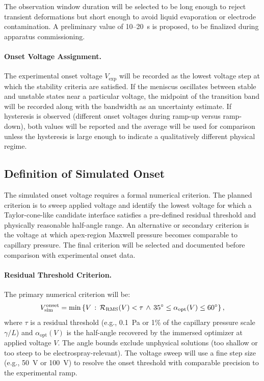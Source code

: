 The observation window duration will be selected to be long enough to reject transient deformations but short enough to avoid liquid evaporation or electrode contamination. A preliminary value of 10--20~s is proposed, to be finalized during apparatus commissioning.

\paragraph{Onset Voltage Assignment.} The experimental onset voltage $V_{\mathrm{exp}}$ will be recorded as the lowest voltage step at which the stability criteria are satisfied. If the meniscus oscillates between stable and unstable states near a particular voltage, the midpoint of the transition band will be recorded along with the bandwidth as an uncertainty estimate. If hysteresis is observed (different onset voltages during ramp-up versus ramp-down), both values will be reported and the average will be used for comparison unless the hysteresis is large enough to indicate a qualitatively different physical regime.

\subsection{Definition of Simulated Onset}

The simulated onset voltage requires a formal numerical criterion. The planned criterion is to sweep applied voltage and identify the lowest voltage for which a Taylor-cone-like candidate interface satisfies a pre-defined residual threshold and physically reasonable half-angle range. An alternative or secondary criterion is the voltage at which apex-region Maxwell pressure becomes comparable to capillary pressure. The final criterion will be selected and documented before comparison with experimental onset data.

\paragraph{Residual Threshold Criterion.} The primary numerical criterion will be:
\begin{equation}
V_{\mathrm{sim}}^{\mathrm{onset}} = \min\left\{V \,:\, \mathcal{R}_{\mathrm{RMS}}(V) < \tau \,\wedge\, 35^{\circ} \leq \alpha_{\mathrm{opt}}(V) \leq 60^{\circ}\right\},
\end{equation}
where $\tau$ is a residual threshold (e.g., \SI{0.1}{Pa} or 1\% of the capillary pressure scale $\gamma/L$) and $\alpha_{\mathrm{opt}}(V)$ is the half-angle recovered by the immersed optimizer at applied voltage $V$. The angle bounds exclude unphysical solutions (too shallow or too steep to be electrospray-relevant). The voltage sweep will use a fine step size (e.g., \SI{50}{V} or \SI{100}{V}) to resolve the onset threshold with comparable precision to the experimental ramp.

